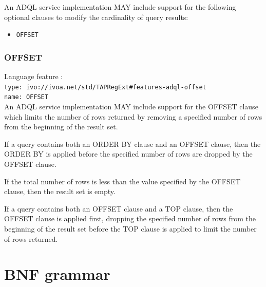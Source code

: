 \documentclass[11pt,a4paper]{ivoa}
\begin{document}
An ADQL service implementation MAY include support for the following optional
clauses to modify the cardinality of query results:

\begin{itemize}
    \item \verb:OFFSET:
\end{itemize}

\subsubsection{OFFSET}
\label{sec:offset}

{\footnotesize Language feature :}\\
{\footnotesize \verb|type: ivo://ivoa.net/std/TAPRegExt#features-adql-offset|}\\
{\footnotesize \verb|name: OFFSET|}\\

An ADQL service implementation MAY include support for the OFFSET clause
which limits the number of rows returned by removing a specified number
of rows from the beginning of the result set.

If a query contains both an ORDER BY clause and an OFFSET clause,
then the ORDER BY is applied before the specified number of 
rows are dropped by the OFFSET clause.

If the total number of rows is less than the value
specified by the OFFSET clause, then the result set is empty.

If a query contains both an OFFSET clause and a TOP clause,
then the OFFSET clause is applied first, dropping the specified
number of rows from the beginning of the result set before the
TOP clause is applied to limit the number of rows returned.

\newpage
\appendix
\section{BNF grammar}
\label{sec:grammar}
\end{document}
